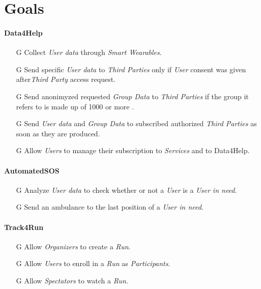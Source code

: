 \documentclass[../../rasd.tex]{subfiles}
\begin{document}
\section{Goals}

\paragraph{Data4Help}
\begin{itemize}
	
	\item[G\subs{1}]Collect \textit{User data} through \textit{Smart Wearables}.
	
	\item[G\subs{2}]Send specific \textit{User data} to \textit{Third Parties} only if \textit{User} consent was given after\textit{Third Party} access request.
	\item[G\subs{3}]Send anonimyzed requested \textit{Group Data} to \textit{Third Parties} if the group it refers to is made up of 1000 or more .

	\item[G\subs{4}]Send \textit{User data} and \textit{Group Data} to subscribed authorized \textit{Third Parties} as soon as they are produced.
	
	\item[G\subs{5}]Allow \textit{Users} to manage their subscription to \textit{Services} and to Data4Help.		
	
\end{itemize}

\paragraph{AutomatedSOS}
\begin{itemize}
	\item[G\subs{6}]Analyze \textit{User data} to check whether or not a \textit{User} is a \textit{User in need}.
	\item[G\subs{7}]Send an ambulance to the last position of a \textit{User in need}.
\end{itemize}

\paragraph{Track4Run}
\begin{itemize}
	\item[G\subs{8}]Allow \textit{Organizers} to create a \textit{Run}.
	\item[G\subs{9}]Allow \textit{Users} to enroll in a \textit{Run} as \textit{Participants}. 
	\item[G\subs{10}]Allow \textit{Spectators} to watch a \textit{Run}.
\end{itemize}
\end{document}
